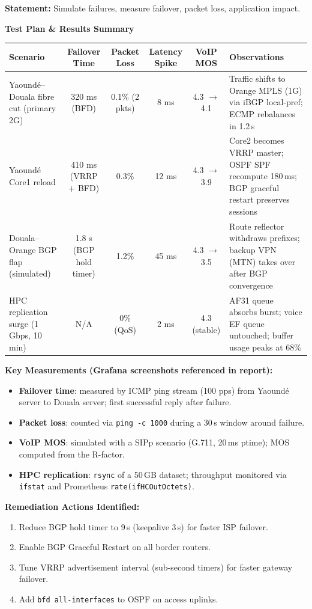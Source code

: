 \documentclass[11pt]{article}
\begin{document}
\begin{exoresolu}
\textbf{Statement:} Simulate failures, measure failover, packet loss, application impact.

\tcblower
\textbf{Test Plan \& Results Summary}
\begin{center}
\begin{tabularx}{\linewidth}{|l|c|c|c|c|X|}
\hline
\rowcolor{popblueL}
\textbf{Scenario} & \textbf{Failover Time} & \textbf{Packet Loss} & \textbf{Latency Spike} & \textbf{VoIP MOS} & \textbf{Observations} \\
\hline
Yaoundé–Douala fibre cut (primary 2G) & 320 ms (BFD) & 0.1\% (2 pkts) & 8 ms & 4.3 $\to$ 4.1 & Traffic shifts to Orange MPLS (1G) via iBGP local-pref; ECMP rebalances in 1.2\,s \\
\hline
Yaoundé Core1 reload & 410 ms (VRRP + BFD) & 0.3\% & 12 ms & 4.3 $\to$ 3.9 & Core2 becomes VRRP master; OSPF SPF recompute 180\,ms; BGP graceful restart preserves sessions \\
\hline
Douala–Orange BGP flap (simulated) & 1.8 s (BGP hold timer) & 1.2\% & 45 ms & 4.3 $\to$ 3.5 & Route reflector withdraws prefixes; backup VPN (MTN) takes over after BGP convergence \\
\hline
HPC replication surge (1\,Gbps, 10\,min) & N/A & 0\% (QoS) & 2 ms & 4.3 (stable) & AF31 queue absorbs burst; voice EF queue untouched; buffer usage peaks at 68\% \\
\hline
\end{tabularx}
\end{center}

\textbf{Key Measurements (Grafana screenshots referenced in report):}
\begin{itemize}
    \item \textbf{Failover time}: measured by ICMP ping stream (100 pps) from Yaoundé server to Douala server; first successful reply after failure.
    \item \textbf{Packet loss}: counted via \texttt{ping -c 1000} during a 30\,s window around failure.
    \item \textbf{VoIP MOS}: simulated with a SIPp scenario (G.711, 20\,ms ptime); MOS computed from the R-factor.
    \item \textbf{HPC replication}: \texttt{rsync} of a 50\,GB dataset; throughput monitored via \texttt{ifstat} and Prometheus \texttt{rate(ifHCOutOctets)}.
\end{itemize}

\textbf{Remediation Actions Identified:}
\begin{enumerate}
    \item Reduce BGP hold timer to 9\,s (keepalive 3\,s) for faster ISP failover.
    \item Enable BGP Graceful Restart on all border routers.
    \item Tune VRRP advertisement interval (sub-second timers) for faster gateway failover.
    \item Add \texttt{bfd all-interfaces} to OSPF on access uplinks.
\end{enumerate}
\end{exoresolu}
\end{document}
